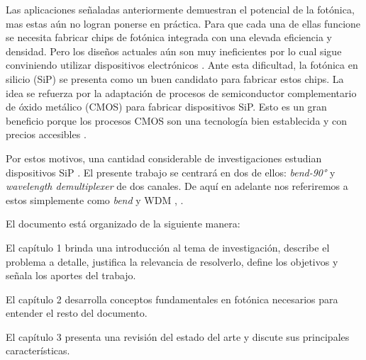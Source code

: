  Las aplicaciones señaladas anteriormente demuestran el potencial de la fotónica, mas estas aún no logran ponerse en práctica. 
Para que cada una de ellas funcione se necesita fabricar chips de fotónica integrada con una elevada eficiencia y densidad.
Pero los diseños actuales aún son muy ineficientes por lo cual sigue conviniendo utilizar dispositivos electrónicos \citep{Glick2018, Vuckovic2019}. 
Ante esta dificultad, la fotónica en silicio (SiP) se presenta como un buen candidato para fabricar estos chips.
La idea se refuerza por la adaptación de procesos de semiconductor complementario de óxido metálico (CMOS) para fabricar dispositivos SiP.
Esto es un gran beneficio porque los procesos CMOS son una tecnología bien establecida y con precios accesibles \citep{Glick2018, Shen2019, LukasChrostowski2010}.


Por estos motivos, una cantidad considerable de investigaciones estudian dispositivos SiP \citep{Molesky2018}.
El presente trabajo se centrará en dos de ellos:  \emph{bend-90°} y \emph{wavelength demultiplexer} de dos canales.
 De aquí en adelante nos referiremos a estos simplemente como \emph{bend} y WDM , .


El documento está organizado de la siguiente manera:

El capítulo 1 brinda una introducción al tema de investigación, describe el problema a detalle, justifica la relevancia de resolverlo, define los objetivos y señala los aportes del trabajo.

El capítulo 2 desarrolla conceptos fundamentales en fotónica necesarios para entender el resto del documento. 

El capítulo 3 presenta una revisión del estado del arte y discute sus principales características. 

